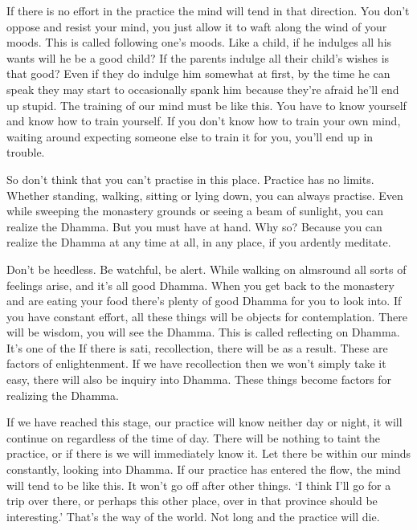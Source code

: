 If there is no effort in the practice the mind will tend in that direction. You don't oppose and resist your mind, you just allow it to waft along the wind of your moods. This is called following one's moods. Like a child, if he indulges all his wants will he be a good child? If the parents indulge all their child's wishes is that good? Even if they do indulge him somewhat at first, by the time he can speak they may start to occasionally spank him because they're afraid he'll end up stupid. The training of our mind must be like this. You have to know yourself and know how to train yourself. If you don't know how to train your own mind, waiting around expecting someone else to train it for you, you'll end up in trouble. 

So don't think that you can't practise in this place. Practice has no limits. Whether standing, walking, sitting or lying down, you can always practise. Even while sweeping the monastery grounds or seeing a beam of sunlight, you can realize the Dhamma. But you must have  at hand. Why so? Because you can realize the Dhamma at any time at all, in any place, if you ardently meditate. 

Don't be heedless. Be watchful, be alert. While walking on almsround all sorts of feelings arise, and it's all good Dhamma. When you get back to the monastery and are eating your food there's plenty of good Dhamma for you to look into. If you have constant effort, all these things will be objects for contemplation. There will be wisdom, you will see the Dhamma. This is called  reflecting on Dhamma. It's one of the  If there is sati, recollection, there will be  as a result. These are factors of enlightenment. If we have recollection then we won't simply take it easy, there will also be inquiry into Dhamma. These things become factors for realizing the Dhamma. 

If we have reached this stage, our practice will know neither day or night, it will continue on regardless of the time of day. There will be nothing to taint the practice, or if there is we will immediately know it. Let there be  within our minds constantly, looking into Dhamma. If our practice has entered the flow, the mind will tend to be like this. It won't go off after other things. `I think I'll go for a trip over there, or perhaps this other place, over in that province should be interesting.' That's the way of the world. Not long and the practice will die. 

